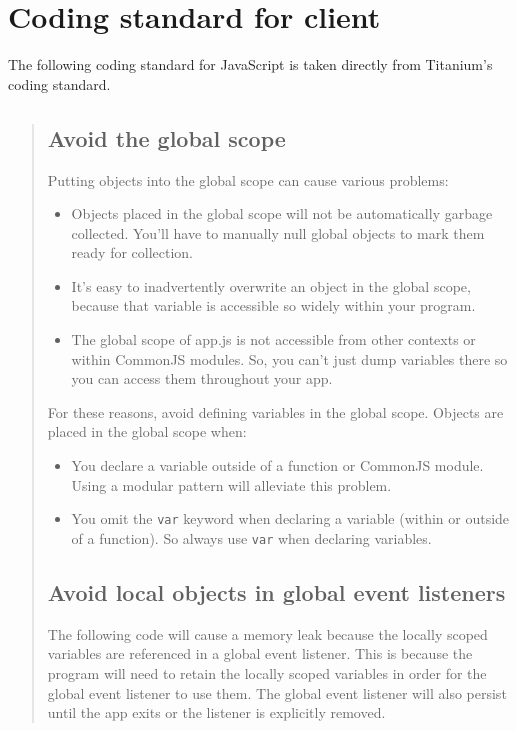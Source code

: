 \documentclass[11pt]{book}
\begin{document}
\section{Coding standard for client}
The following coding standard for JavaScript is taken directly from Titanium's coding standard\cite{titaniumCodingStandard}.

\begin{quotation}\noindent
\subsection{Avoid the global scope}
Putting objects into the global scope can cause various problems:
\begin{itemize}
    \item Objects placed in the global scope will not be automatically garbage collected. You'll have to manually null global objects to mark them ready for collection.
    \item It's easy to inadvertently overwrite an object in the global scope, because that variable is accessible so widely within your program.
    \item The global scope of app.js is not accessible from other contexts or within CommonJS modules. So, you can't just dump variables there so you can access them throughout your app.
\end{itemize}

For these reasons, avoid defining variables in the global scope. Objects are placed in the global scope when:
\begin{itemize}
    \item You declare a variable outside of a function or CommonJS module. Using a modular pattern will alleviate this problem.
    \item You omit the \texttt{var} keyword when declaring a variable (within or outside of a function). So always use \texttt{var} when declaring variables.
\end{itemize}

\subsection{Avoid local objects in global event listeners}
The following code will cause a memory leak because the locally scoped variables are referenced in a global event listener. This is because the program will need to retain the locally scoped variables in order for the global event listener to use them. The global event listener will also persist until the app exits or the listener is explicitly removed.


\end{quotation}
\end{document}
